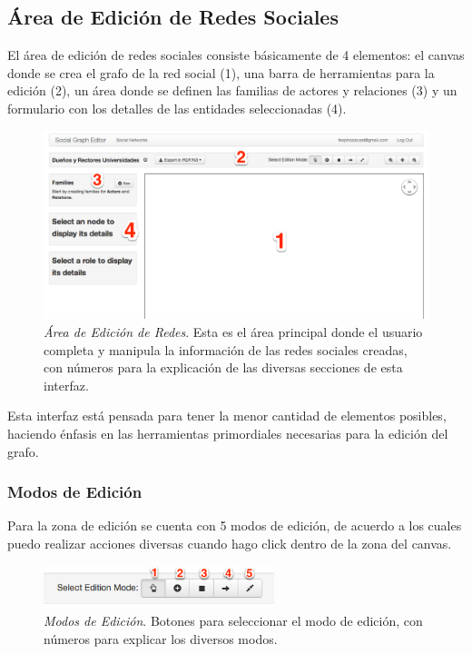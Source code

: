 \subsection{Área de Edición de Redes Sociales} %
\label{sub:area_de_edicion_de_redes_sociales}

El área de edición de redes sociales consiste básicamente de 4 elementos: el canvas donde se crea el grafo de la red social (1), una barra de herramientas para la edición (2), un área donde se definen las familias de actores y relaciones (3) y un formulario con los detalles de las entidades seleccionadas (4).

\begin{figure}[H]
  \includegraphics[width=1.0\textwidth]{images/area_edicion_redes.png}
  \caption[Área de Edición de Redes]{\emph{Área de Edición de Redes}. Esta es el área principal donde el usuario completa y manipula la información de las redes sociales creadas, con números para la explicación de las diversas secciones de esta interfaz.}
  \label{area_edicion_redes}
\end{figure}

Esta interfaz está pensada para tener la menor cantidad de elementos posibles, haciendo énfasis en las herramientas primordiales necesarias para la edición del grafo.

\subsubsection{Modos de Edición} %
\label{ssub:modos_de_edicion}

Para la zona de edición se cuenta con 5 modos de edición, de acuerdo a los cuales puedo realizar acciones diversas cuando hago click dentro de la zona del canvas.

\begin{figure}[H]
  \centering
  \includegraphics[width=0.6\textwidth]{images/modos_edicion.png}
  \caption[Modos de Edición]{\emph{Modos de Edición}. Botones para seleccionar el modo de edición, con números para explicar los diversos modos.}
  \label{modos_edicion}
\end{figure}

